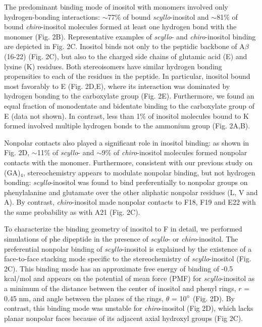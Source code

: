 
The predominant binding mode of inositol with monomers involved only hydrogen-bonding interactions: $\sim$77\% of bound \emph{scyllo}-inositol and $\sim$81\% of bound \emph{chiro}-inositol molecules formed at least one hydrogen bond with the monomer (Fig. 2B). Representative examples of \emph{scyllo}- and \emph{chiro}-inositol binding are depicted in Fig. 2C.  Inositol binds not only to the peptidic backbone of A$\beta$(16-22) (Fig. 2C), but also to the charged side chains of glutamic acid (E) and lysine (K) residues. Both stereoisomers have similar hydrogen bonding propensities to each of the residues in the peptide. In particular, inositol bound most favorably to E (Fig. 2D,E), where its interaction was dominated by hydrogen bonding to the carboxylate group (Fig. 2E). Furthermore, we found an equal fraction of monodentate and bidentate binding to the carboxylate group of E (data not shown). In contrast, less than 1\% of inositol molecules bound to K formed involved multiple hydrogen bonds to the ammonium group (Fig. 2A,B).

Nonpolar contacts also played a significant role in inositol binding: as shown in Fig. 2D, $\sim$11\% of \emph{scyllo}- and $\sim$9\% of \emph{chiro}-inositol molecules formed nonpolar contacts with the monomer. Furthermore, consistent with our previous study on (GA)$_4$, stereochemistry appears to modulate nonpolar binding, but not hydrogen bonding: \emph{scyllo}-inositol was found to bind preferentially to nonpolar groups on phenylalanine and glutamate over the other aliphatic nonpolar residues (L, V and A). By contrast, \emph{chiro}-inositol made nonpolar contacts to F18, F19 and E22 with the same probability as with A21 (Fig. 2C).
	
To characterize the binding geometry of inositol to F in detail, we performed simulations of phe dipeptide in the presence of \emph{scyllo}- or \emph{chiro}-inositol. The preferential nonpolar binding of \emph{scyllo}-inositol is explained by the existence of a face-to-face stacking mode specific to the stereochemistry of \emph{scyllo}-inositol (Fig. 2C). This binding mode has an approximate free energy of binding of -0.5 kcal/mol and appears on the potential of mean force (PMF) for \emph{scyllo}-inositol as a minimum of the distance between the center of inositol and phenyl rings, $r$ = 0.45 nm, and angle between the planes of the rings, $\theta$ = 10$^\circ$ (Fig. 2D). By contrast, this binding mode was unstable for \emph{chiro}-inositol (Fig 2D), which lacks planar nonpolar faces because of its adjacent axial hydroxyl groups (Fig 2C).


